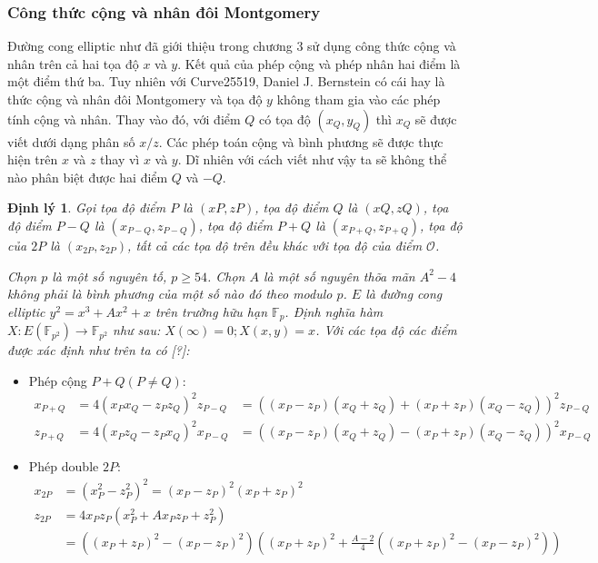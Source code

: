 \documentclass[a4paper,12pt]{report}
\newtheorem{theorem}{Định lý}[chapter]
\begin{document}
\subsubsection{Công thức cộng và nhân đôi Montgomery}
Đường cong elliptic như đã giới thiệu trong chương 3 sử dụng công thức cộng và nhân trên cả hai tọa độ $x$ và $y$. Kết quả của phép cộng và phép nhân hai điểm là một điểm thứ ba. Tuy nhiên với Curve25519, Daniel J. Bernstein có cái hay là thức cộng và nhân đôi Montgomery và tọa độ $y$ không tham gia vào các phép tính cộng và nhân. Thay vào đó, với điểm $Q$ có tọa độ
$(x_Q, y_Q)$ thì $x_Q$ sẽ được viết dưới dạng phân số $x/z$. Các phép toán cộng và bình phương sẽ được thực hiện trên $x$ và $z$ thay vì $x$ và $y$. Dĩ nhiên với cách viết như vậy ta sẽ không thể nào phân biệt được hai điểm $Q$ và $-Q$.
\begin{theorem}
Gọi tọa độ điểm $P$ là $(xP, zP)$, tọa độ điểm $Q$ là $(xQ, zQ)$, tọa độ điểm $P - Q$ là $(x_{P-Q}, z_{P-Q})$, tọa độ điểm $P + Q$ là $(x_{P+Q}, z_{P+Q})$, tọa độ của $2P$ là $(x_{2P}, z_{2P})$, tất cả các tọa độ trên đều khác với tọa độ của điểm $\mathcal{O}$.

Chọn $p$ là một số nguyên tố, $p \geq 54$. Chọn $A$ là một số nguyên thõa mãn $A^2 - 4$ không phải là bình phương của một số nào đó theo modulo $p$. $E$ là đường cong elliptic $y^2 = x^3 + Ax^2 + x$ trên trường hữu hạn $\mathbb{F}_p$. Định nghĩa hàm $X : E(\mathbb{F}_{p^2}) \rightarrow \mathbb{F}_{p^2}$ như sau: $X(\infty) = 0; X(x, y) = x$. Với các tọa độ các điểm được xác định như trên ta có [?]:
\end{theorem} 
\begin{itemize}
\item[] Phép cộng $P + Q (P \neq Q)$:
\begin{displaymath}
\begin{aligned}
x_{P+Q} & = 4(x_P x_Q - z_Pz_Q)^2z_{P-Q} & = ((x_P - z_P)(x_Q + z_Q) + (x_P + z_P)(x_Q - z_Q))^2z_{P-Q} \\
z_{P+Q} & = 4(x_Pz_Q - z_Px_Q)^2x_{P-Q} & = ((x_P - z_P)(x_Q + z_Q) - (x_P + z_P)(x_Q - z_Q))^2x_{P-Q}
\end{aligned}
\end{displaymath}
\item[] Phép double $2P$:
\begin{displaymath}
\begin{aligned}
x_{2P} & = (x^2_P - z^2_P)^2  = (x_P - z_P)^2(x_P + z_P)^2 \\
z_{2P} & = 4x_Pz_P(x^2_P + Ax_Pz_P + z^2_P) \\ & = ((x_P + z_P)^2 - (x_P - z_P)^2)\left((x_P + z_P)^2 + \frac{A - 2}{4}((x_P + z_P)^2 - (x_P - z_P)^2) \right)
\end{aligned}
\end{displaymath}
\end{itemize}
\end{document}

